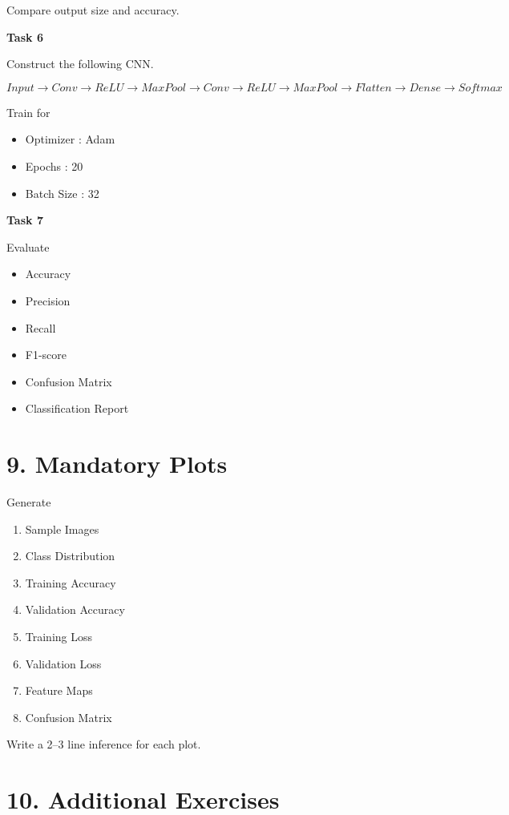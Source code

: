\documentclass[11pt]{article}
\begin{document}
Compare output size and accuracy.

\bigskip

\textbf{Task 6}

Construct the following CNN.

\[
Input
\rightarrow
Conv
\rightarrow
ReLU
\rightarrow
MaxPool
\rightarrow
Conv
\rightarrow
ReLU
\rightarrow
MaxPool
\rightarrow
Flatten
\rightarrow
Dense
\rightarrow
Softmax
\]

Train for

\begin{itemize}
\item Optimizer : Adam
\item Epochs : 20
\item Batch Size : 32
\end{itemize}

\bigskip

\textbf{Task 7}

Evaluate

\begin{itemize}
\item Accuracy
\item Precision
\item Recall
\item F1-score
\item Confusion Matrix
\item Classification Report
\end{itemize}

\section*{9. Mandatory Plots}

Generate

\begin{enumerate}
\item Sample Images
\item Class Distribution
\item Training Accuracy
\item Validation Accuracy
\item Training Loss
\item Validation Loss
\item Feature Maps
\item Confusion Matrix
\end{enumerate}

Write a 2--3 line inference for each plot.

\section*{10. Additional Exercises}
\end{document}

